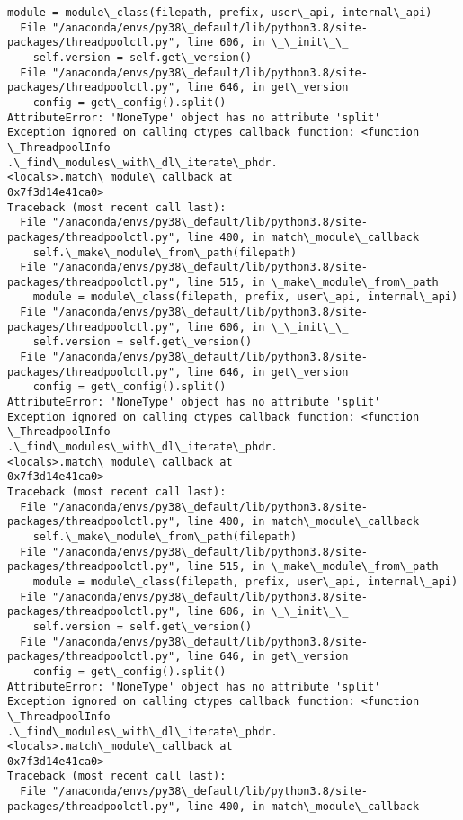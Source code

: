 \documentclass[11pt]{article}
\begin{document}
\begin{Verbatim}[commandchars=\\\{\}]
    module = module\_class(filepath, prefix, user\_api, internal\_api)
  File "/anaconda/envs/py38\_default/lib/python3.8/site-
packages/threadpoolctl.py", line 606, in \_\_init\_\_
    self.version = self.get\_version()
  File "/anaconda/envs/py38\_default/lib/python3.8/site-
packages/threadpoolctl.py", line 646, in get\_version
    config = get\_config().split()
AttributeError: 'NoneType' object has no attribute 'split'
Exception ignored on calling ctypes callback function: <function \_ThreadpoolInfo
.\_find\_modules\_with\_dl\_iterate\_phdr.<locals>.match\_module\_callback at
0x7f3d14e41ca0>
Traceback (most recent call last):
  File "/anaconda/envs/py38\_default/lib/python3.8/site-
packages/threadpoolctl.py", line 400, in match\_module\_callback
    self.\_make\_module\_from\_path(filepath)
  File "/anaconda/envs/py38\_default/lib/python3.8/site-
packages/threadpoolctl.py", line 515, in \_make\_module\_from\_path
    module = module\_class(filepath, prefix, user\_api, internal\_api)
  File "/anaconda/envs/py38\_default/lib/python3.8/site-
packages/threadpoolctl.py", line 606, in \_\_init\_\_
    self.version = self.get\_version()
  File "/anaconda/envs/py38\_default/lib/python3.8/site-
packages/threadpoolctl.py", line 646, in get\_version
    config = get\_config().split()
AttributeError: 'NoneType' object has no attribute 'split'
Exception ignored on calling ctypes callback function: <function \_ThreadpoolInfo
.\_find\_modules\_with\_dl\_iterate\_phdr.<locals>.match\_module\_callback at
0x7f3d14e41ca0>
Traceback (most recent call last):
  File "/anaconda/envs/py38\_default/lib/python3.8/site-
packages/threadpoolctl.py", line 400, in match\_module\_callback
    self.\_make\_module\_from\_path(filepath)
  File "/anaconda/envs/py38\_default/lib/python3.8/site-
packages/threadpoolctl.py", line 515, in \_make\_module\_from\_path
    module = module\_class(filepath, prefix, user\_api, internal\_api)
  File "/anaconda/envs/py38\_default/lib/python3.8/site-
packages/threadpoolctl.py", line 606, in \_\_init\_\_
    self.version = self.get\_version()
  File "/anaconda/envs/py38\_default/lib/python3.8/site-
packages/threadpoolctl.py", line 646, in get\_version
    config = get\_config().split()
AttributeError: 'NoneType' object has no attribute 'split'
Exception ignored on calling ctypes callback function: <function \_ThreadpoolInfo
.\_find\_modules\_with\_dl\_iterate\_phdr.<locals>.match\_module\_callback at
0x7f3d14e41ca0>
Traceback (most recent call last):
  File "/anaconda/envs/py38\_default/lib/python3.8/site-
packages/threadpoolctl.py", line 400, in match\_module\_callback

\end{Verbatim}
\end{document}
